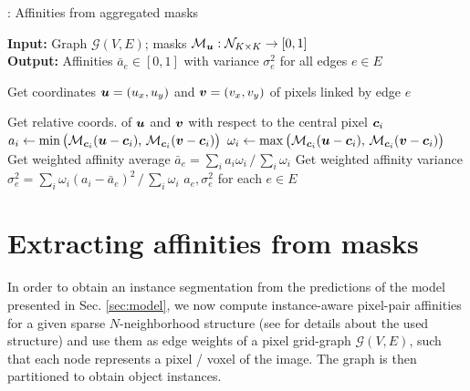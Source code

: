 \begin{algorithm}[t]
  \begin{flushleft}
  \caption{: Affinities from aggregated \maskname masks}
   \hspace*{\algorithmicindent} \textbf{Input:} Graph $\mathcal{G}(V,E)$; \maskname masks $\mathcal{M}_{\coord{u}}: \mathcal{N}_{K\times K} \rightarrow [0,1]$  \\
  \hspace*{\algorithmicindent} \textbf{Output:} Affinities $\bar{a}_e\in[0,1]$ with variance $\sigma^2_e$ for all edges $e\in E$\\
  \hspace*{\algorithmicindent} 
  \begin{algorithmic}[1]
  \footnotesize
        \State Get coordinates $\coord{u}=(u_x,u_y)$ and $\coord{v}=(v_x,v_y)$ of pixels linked by edge $e$

            \State Get relative coords. of $\coord{u}$ and $\coord{v}$ with respect to the central pixel $\coord{c}_i$
            \State $a_i \gets \min \big(\mathcal{M}_{\coord{c}_i}(\coord{u} - \coord{c}_i), \,\mathcal{M}_{\coord{c}_i}(\coord{v} - \coord{c}_i)\big)$ 
            \State $\omega_i \gets \max \big(\mathcal{M}_{\coord{c}_i}(\coord{u} - \coord{c}_i), \,\mathcal{M}_{\coord{c}_i}(\coord{v} - \coord{c}_i)\big)$ 
        \EndFor
        \State Get weighted affinity average $\bar{a}_e= \sum_{i} a_i \omega_i\,/\,\sum_{i}\omega_i$ 
        \State Get weighted affinity variance $\sigma^2_e = \sum_{i} \omega_i (a_i-\bar{a}_e)^2\,/\,\sum_{i}\omega_i$
      \EndFor
      \State
      \Return $a_e, \sigma^2_e$ for each $e\in E$
  \end{algorithmic}
    \label{alg:computing_affinities}
  \end{flushleft}

\end{algorithm}

\section{Extracting affinities from \maskname masks}
In order to obtain an instance segmentation from the predictions of the model presented in Sec. \ref{sec:model}, we now compute instance-aware pixel-pair affinities for a given sparse $N$-neighborhood structure (see  for details about the used structure) and use them as edge weights of a pixel grid-graph $\mathcal{G}(V,E)$, such that each node represents a pixel / voxel of the image. The graph is then partitioned to obtain object instances.

